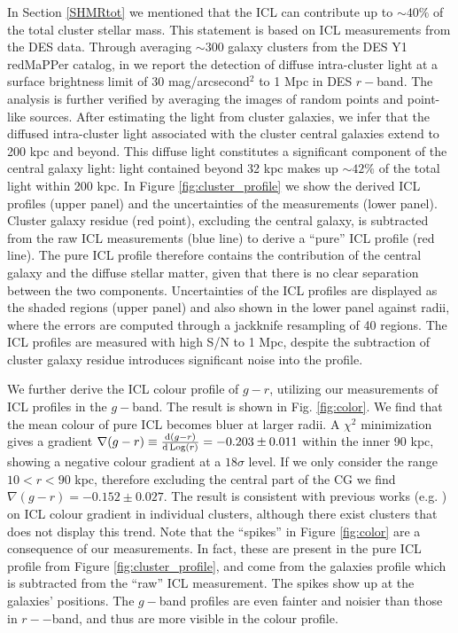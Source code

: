 {In Section \ref{SHMRtot} we mentioned that the ICL can contribute up to $\sim 40\%$ of the total cluster stellar mass. This statement is based on ICL measurements from the DES data. Through averaging $\sim300$ galaxy clusters from the DES Y1 redMaPPer catalog, in \citet{icl} we report the detection of diffuse intra-cluster light at a surface brightness limit of 30 mag/arcsecond$^{2}$ to 1 Mpc in DES $r-$band. The analysis is further verified by averaging the images of random points and point-like sources. After estimating the light from cluster galaxies, we infer that the diffused intra-cluster light associated with the cluster central galaxies extend to 200 kpc and beyond. This diffuse light constitutes a significant component of the central galaxy light: light contained beyond 32 kpc makes up $\sim 42\%$ of the total light within 200 kpc. In Figure \ref{fig:cluster_profile} we show the derived ICL profiles (upper panel) and the uncertainties of the measurements (lower panel). Cluster galaxy residue (red point), excluding the central galaxy, is subtracted from the raw ICL measurements (blue line) to derive a ``pure'' ICL profile (red line). The pure ICL profile therefore contains the contribution of the central galaxy and the diffuse stellar matter, given that there is no clear separation between the two components.  Uncertainties of the ICL profiles are displayed as the shaded regions (upper panel) and also shown in the lower panel against radii, where the errors are computed through a jackknife resampling of 40 regions. The ICL profiles are measured with high S/N to 1 Mpc, despite the subtraction of cluster galaxy residue introduces significant noise into the profile.

We further derive the ICL colour profile of $g-r$, utilizing our measurements of ICL profiles in the $g-$band. The result is shown in Fig. \ref{fig:color}. We find that the mean colour of pure ICL becomes bluer at larger radii. A $\chi^2$ minimization gives a gradient $\nabla (g-r) \equiv \frac{{\rm d} (g-r)}{{\rm d \, Log}(r)}=-0.203\pm 0.011$ within the inner 90 kpc, showing a negative colour gradient at a $18\sigma$ level. If we only consider the range $10<r<90$ kpc, therefore excluding the central part of the CG we find $\nabla (g-r) =-0.152\pm 0.027$. The result is consistent with previous works (e.g. \citealt{demaio}) on ICL colour gradient in individual clusters, although there exist clusters that does not display this trend. Note that the ``spikes'' in Figure \ref{fig:color} are a consequence of our measurements. In fact, these are present in the pure ICL profile from Figure \ref{fig:cluster_profile}, and come from the galaxies profile which is subtracted from the ``raw'' ICL measurement. The spikes show up at the galaxies' positions. The $g-$band profiles are even fainter and noisier than those in $r--$band, and thus are more visible in the colour profile.

}
